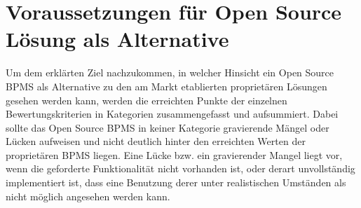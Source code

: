 \section{Voraussetzungen für Open Source Lösung als Alternative}
\label{voraussetzungAlternative}
Um dem erklärten Ziel nachzukommen, in welcher Hinsicht ein Open Source BPMS als Alternative zu den am Markt etablierten proprietären Lösungen gesehen werden kann, werden die erreichten Punkte der einzelnen Bewertungskriterien in Kategorien zusammengefasst und aufsummiert. Dabei sollte das Open Source BPMS in keiner Kategorie gravierende Mängel oder Lücken aufweisen und nicht deutlich hinter den erreichten Werten der proprietären BPMS liegen. Eine Lücke bzw. ein gravierender Mangel liegt vor, wenn die geforderte Funktionalität nicht vorhanden ist, oder derart unvollständig implementiert ist, dass eine Benutzung derer unter realistischen Umständen als nicht möglich angesehen werden kann. 


